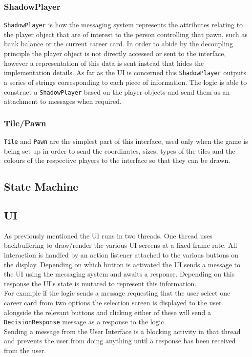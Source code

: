 \documentclass[a4paper, 11pt]{article}
\begin{document}
	\subsubsection*{ShadowPlayer}
	\texttt{ShadowPlayer} is how the messaging system represents the attributes relating to the player object that are of interest to the person controlling that pawn, such as bank balance or the current career card.
	In order to abide by the decoupling principle the player object is not directly accessed or sent to the interface, however a representation of this data is sent instead that hides the implementation details.
	As far as the UI is concerned this \texttt{ShadowPlayer} outputs a series of strings corresponding to each piece of information.
	The logic is able to construct a \texttt{ShadowPlayer} based on the player objects and send them as an attachment to messages when required.
	\subsubsection*{Tile/Pawn}
	\texttt{Tile} and \texttt{Pawn} are the simplest part of this interface, used only when the game is being set up in order to send the coordinates, sizes, types of the tiles and the colours of the respective players to the interface so that they can be drawn.
	
	\subsection*{State Machine}
	\subsection*{UI}
	As previously mentioned the UI runs in two threads. One thread uses backbuffering to draw/render the various UI screens at a fixed frame rate. All interaction is handled by an action listener attached to the various buttons on the display. Depending on which button is activated the UI sends a message to the UI using the messaging system and awaits a response. Depending on this response the UI's state is mutated to represent this information.\\
	For example if the logic sends a message requesting that the user select one career card from two options the selection screen is displayed to the user alongside the relevant buttons and clicking either of these will send a \texttt{DecisionResponse} message as a response to the logic.\\
	Sending a message from the User Interface is a blocking activity in that thread and prevents the user from doing anything until a response has been received from the user.
	
\end{document}
